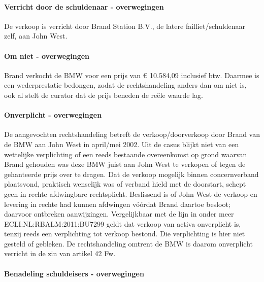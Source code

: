 \documentclass[
  dutch,
  a4paper,
]{article}
\begin{document}
\paragraph{Verricht door de schuldenaar - overwegingen}\label{verricht-door-de-schuldenaar---overwegingen-61}

De verkoop is verricht door Brand Station B.V., de latere failliet/schuldenaar zelf, aan John West.

\paragraph{Om niet - overwegingen}\label{om-niet---overwegingen-61}

Brand verkocht de BMW voor een prijs van € 10.584,09 inclusief btw. Daarmee is een wederprestatie bedongen, zodat de rechtshandeling anders dan om niet is, ook al stelt de curator dat de prijs beneden de reële waarde lag.

\paragraph{Onverplicht - overwegingen}\label{onverplicht---overwegingen-61}

De aangevochten rechtshandeling betreft de verkoop/doorverkoop door Brand van de BMW aan John West in april/mei 2002. Uit de casus blijkt niet van een wettelijke verplichting of een reeds bestaande overeenkomst op grond waarvan Brand gehouden was deze BMW juist aan John West te verkopen of tegen de gehanteerde prijs over te dragen. Dat de verkoop mogelijk binnen concernverband plaatsvond, praktisch wenselijk was of verband hield met de doorstart, schept geen in rechte afdwingbare rechtsplicht. Beslissend is of John West de verkoop en levering in rechte had kunnen afdwingen vóórdat Brand daartoe besloot; daarvoor ontbreken aanwijzingen. Vergelijkbaar met de lijn in onder meer ECLI:NL:RBALM:2011:BU7299 geldt dat verkoop van activa onverplicht is, tenzij reeds een verplichting tot verkoop bestond. Die verplichting is hier niet gesteld of gebleken. De rechtshandeling omtrent de BMW is daarom onverplicht verricht in de zin van artikel 42 Fw.

\paragraph{Benadeling schuldeisers - overwegingen}\label{benadeling-schuldeisers---overwegingen-61}
\end{document}
